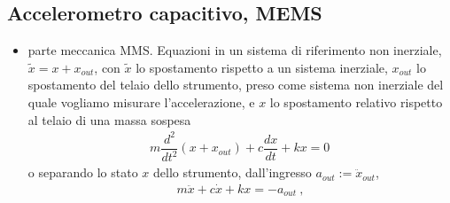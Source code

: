 \documentclass[letterpaper,10pt,italian]{jupyterBook}
\begin{document}
\subsection{Accelerometro capacitivo, MEMS}
\label{\detokenize{ch/electromagnetism/electrical-engineering-instruments:accelerometro-capacitivo-mems}}\label{\detokenize{ch/electromagnetism/electrical-engineering-instruments:physics-hs-electromagnetism-instruments-accelerometer-mems}}\begin{itemize}
\item {} 
\sphinxAtStartPar
parte meccanica MMS. Equazioni in un sistema di riferimento non inerziale, \(\tilde{x} = x + x_{out}\), con \(\tilde{x}\) lo spostamento rispetto a un sistema inerziale, \(x_{out}\) lo spostamento del telaio dello strumento, preso come sistema non inerziale del quale vogliamo misurare l’accelerazione, e \(x\) lo spostamento relativo rispetto al telaio di una massa sospesa
\begin{equation*}
\begin{split}m \dfrac{d^2}{dt^2}(x + x_{out}) + c \dfrac{d x}{dt} + k x = 0 \, \end{split}
\end{equation*}
\sphinxAtStartPar
o separando lo stato \(x\) dello strumento, dall’ingresso \(a_{out} := \ddot{x}_{out}\),
\begin{equation*}
\begin{split}m \ddot{x} + c \dot{x} + k x = - a_{out} \ ,\end{split}
\end{equation*}
\end{itemize}
\end{document}
